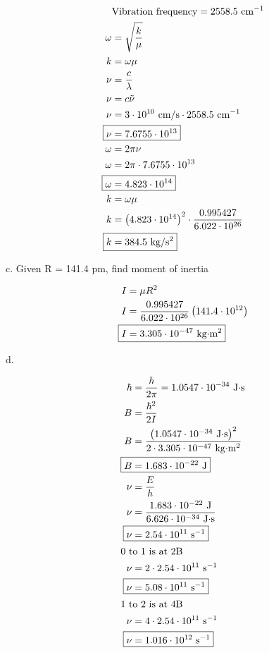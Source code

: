 \documentclass[12pt]{article}
\begin{document}
\begin{enumerate}
    \begin{align*}
        & \text{Vibration frequency} = 2558.5 \text{ cm$^{-1}$} \\
        \omega &= \sqrt{\frac{k}{\mu}} \\
        k &= \omega \mu \\
        \nu &= \frac{c}{\lambda} \\
        \nu &= c \tilde{\nu} \\
        \nu &= 3\cdot10^{10} \text{ cm/s} \cdot 2558.5 \text{ cm$^{-1}$} \\
        \Aboxed{\nu &= 7.6755\cdot10^{13}} \\
        \omega &= 2\pi\nu \\
        \omega &= 2\pi \cdot 7.6755\cdot10^{13} \\
        \Aboxed{\omega &= 4.823\cdot10^{14}} \\
        k &= \omega \mu \\
        k &= \left(4.823\cdot10^{14}\right)^2 \cdot \frac{0.995427}{6.022\cdot10^{26}} \\
        \Aboxed{k &= 384.5 \text{ kg/s$^2$}}
    \end{align*}

    c. Given R = 141.4 pm, find moment of inertia

    \begin{align*}
        I &= \mu R^2 \\
        I &= \frac{0.995427}{6.022\cdot10^{26}} \left(141.4\cdot10^{12}\right) \\
        \Aboxed{I &= 3.305\cdot10^{-47} \text{ kg$\cdot$m$^2$}}
    \end{align*}

    d.

    \begin{align*}
        \hbar &= \frac{h}{2\pi} = 1.0547\cdot10^{-34} \text{ J$\cdot$s} \\
        B &= \frac{\hbar^2}{2I} \\
        B &= \frac{\left(1.0547\cdot10^{-34} \text{ J$\cdot$s}\right)^2}{2 \cdot 3.305\cdot10^{-47} \text{ kg$\cdot$m$^2$}} \\
        \Aboxed{B &= 1.683\cdot10^{-22} \text{ J}} \\
        \nu &= \frac{E}{h} \\
        \nu &= \frac{1.683\cdot10^{-22} \text{ J}}{6.626\cdot10^{-34} \text{ J$\cdot$s}} \\
        \Aboxed{\nu &= 2.54\cdot10^{11} \text{ s$^{-1}$}} \\
        \intertext{0 to 1 is at 2B}
        \nu &= 2 \cdot 2.54\cdot10^{11} \text{ s$^{-1}$} \\
        \Aboxed{\nu &= 5.08\cdot10^{11} \text{ s$^{-1}$}} \\
        \intertext{1 to 2 is at 4B}
        \nu &= 4 \cdot 2.54\cdot10^{11} \text{ s$^{-1}$} \\
        \Aboxed{\nu &= 1.016\cdot10^{12} \text{ s$^{-1}$}}
    \end{align*}


\end{enumerate}
\end{document}
